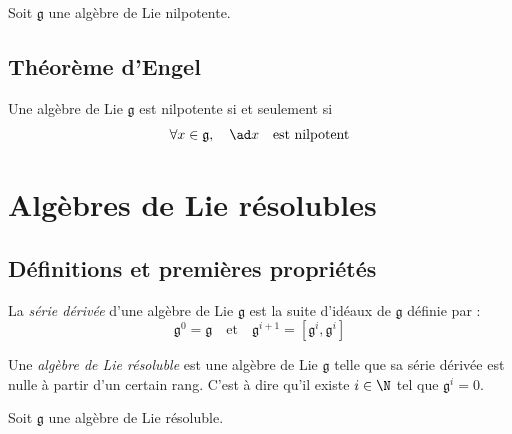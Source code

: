 \begin{proposition}
    Soit $\mathfrak{g}$ une algèbre de Lie nilpotente.
\end{proposition}

\omitted

\subsection{Théorème d'Engel}

\begin{theorem}
    Une algèbre de Lie $\mathfrak{g}$ est nilpotente si et seulement si 
    $$\forall x\in \mathfrak{g}, \quad \ad x \quad \text{est nilpotent}$$ 
\end{theorem}

\omitted

\section{Algèbres de Lie résolubles}

\subsection{Définitions et premières propriétés}

\begin{definition}
    La \emph{série dérivée} d'une algèbre de Lie $\mathfrak{g}$ est la suite d'idéaux de $\mathfrak{g}$ définie par :
    $$\mathfrak{g}^0 = \mathfrak{g} \quad \text{et} \quad \mathfrak{g}^{i+1} = [\mathfrak{g}^i, \mathfrak{g}^i]$$
\end{definition}

\begin{definition}
    Une \emph{algèbre de Lie résoluble} est une algèbre de Lie $\mathfrak{g}$ telle que sa série dérivée est nulle à partir d'un certain rang. C'est à dire qu'il existe $i \in \N$ tel que $\mathfrak{g}^i = 0$.
\end{definition}

\begin{proposition}
    Soit $\mathfrak{g}$ une algèbre de Lie résoluble.
\end{proposition}

